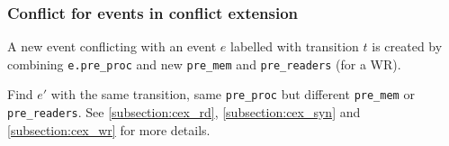\documentclass{llncs}
\begin{document}
\begin{comment}
\begin{algorithm}
\begin{algorithmic}[1]
\Procedure{Checkdicfl}
\verb!e.trans->type = WR!, and \verb!e'.trans->type != WR!, set \verb!parent = e'.pre_mem!
If found(e, parent), return true

\verb!e.trans->type = WR! and \verb!e'.trans->type = WR!

for each \verb!e.pre_readers[i]! $(i \in [0..numprocs])$,

set \verb!parent = e.pre_readers[i]!
if found(e',parent), return true
Let's consider $parent$.

\begin{itemize}
	\item
	\verb!parent->trans->type! is RD or SYN: 
	If found(e') in \verb!parent.post_rws!, then $e$ and $e'$ are in immediate
	conflict
	\item
	\verb!parent->trans->type! is WR: If found(e) and found(e') in the same 
	\verb!parent.post_mem[i]!, then they definitely
	conflict immediately.
\end{itemize}

\end{algorithmic}
\caption{Check direct conflict between two enabled events}
\label{a:dicfl}
\end{algorithm}

\end{comment}
	
\subsubsection{Conflict for events in conflict extension}
\noindent
	A new event conflicting with an event $e$ labelled with transition $t$ is created by
	combining \verb!e.pre_proc! and new \verb!pre_mem! and \verb!pre_readers! (for a WR).

	Find $e'$ with the same transition, same \verb!pre_proc! but different \verb!pre_mem! or
	\verb!pre_readers!. See \cref{subsection:cex_rd}, \cref{subsection:cex_syn} and \cref{subsection:cex_wr} for more details.
	
\end{document}
